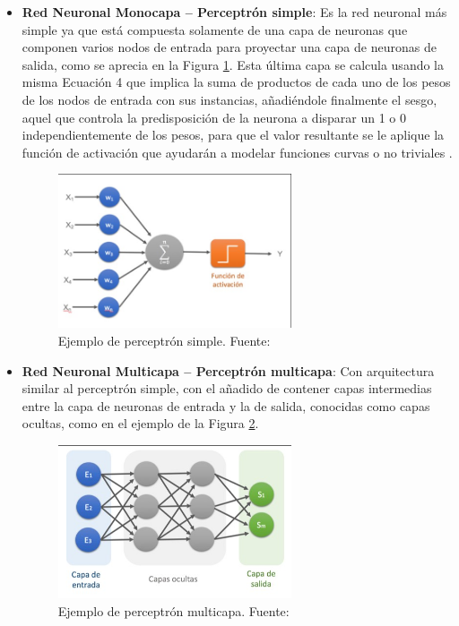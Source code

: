 \begin{itemize}
	\begin{itemize}
		\item \textbf{Red Neuronal Monocapa – Perceptrón simple}: Es la red neuronal más simple ya que está compuesta solamente de una capa de neuronas que componen varios nodos de entrada para proyectar una capa de neuronas de salida, como se aprecia en la Figura \ref{2:fig21}. Esta última capa se calcula usando la misma Ecuación 4 que implica la suma de productos de cada uno de los pesos de los nodos de entrada con sus instancias, añadiéndole finalmente el sesgo, aquel que controla la predisposición de la neurona a disparar un 1 o 0 independientemente de los pesos, para que el valor resultante se le aplique la función de activación que ayudarán a modelar funciones curvas o no triviales \parencite{gl_mlfa2019redesneuronales}.
		\begin{figure}[h]
			\begin{center}
				\includegraphics[width=0.65\textwidth]{2/figures/perceptron_simple.jpg}
				\caption{Ejemplo de perceptrón simple. Fuente: \cite{gl_calvo2017clasifrna}}
				\label{2:fig21}
			\end{center}
		\end{figure}
		
		\item \textbf{Red Neuronal Multicapa – Perceptrón multicapa}: Con arquitectura similar al perceptrón simple, con el añadido de contener capas intermedias entre la capa de neuronas de entrada y la de salida, conocidas como capas ocultas, como en el ejemplo de la Figura \ref{2:fig22}.
		\begin{figure}[h]
			\begin{center}
				\includegraphics[width=0.65\textwidth]{2/figures/perceptron_multicapa.jpg}
				\caption{Ejemplo de perceptrón multicapa. Fuente: \cite{gl_calvo2017clasifrna}}
				\label{2:fig22}
			\end{center}
		\end{figure}
		

\end{itemize}
\end{itemize}
